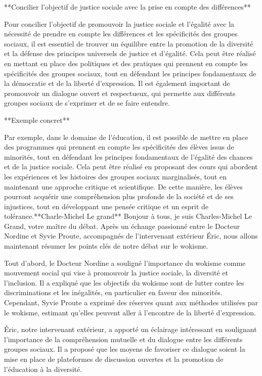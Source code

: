 **Concilier l'objectif de justice sociale avec la prise en compte des différences**

Pour concilier l'objectif de promouvoir la justice sociale et l'égalité avec la nécessité de prendre en compte les différences et les spécificités des groupes sociaux, il est essentiel de trouver un équilibre entre la promotion de la diversité et la défense des principes universels de justice et d'égalité. Cela peut être réalisé en mettant en place des politiques et des pratiques qui prennent en compte les spécificités des groupes sociaux, tout en défendant les principes fondamentaux de la démocratie et de la liberté d'expression. Il est également important de promouvoir un dialogue ouvert et respectueux, qui permette aux différents groupes sociaux de s'exprimer et de se faire entendre.

**Exemple concret**

Par exemple, dans le domaine de l'éducation, il est possible de mettre en place des programmes qui prennent en compte les spécificités des élèves issus de minorités, tout en défendant les principes fondamentaux de l'égalité des chances et de la justice sociale. Cela peut être réalisé en proposant des cours qui abordent les expériences et les histoires des groupes sociaux marginalisés, tout en maintenant une approche critique et scientifique. De cette manière, les élèves pourront acquérir une compréhension plus profonde de la société et de ses injustices, tout en développant une pensée critique et un esprit de tolérance.**Charle-Michel Le grand**
Bonjour à tous, je suis Charles-Michel Le Grand, votre maître du débat. Après un échange passionné entre le Docteur Nordine et Syvie Proute, accompagnés de l'intervenant extérieur Éric, nous allons maintenant résumer les points clés de notre débat sur le wokisme.

Tout d'abord, le Docteur Nordine a souligné l'importance du wokisme comme mouvement social qui vise à promouvoir la justice sociale, la diversité et l'inclusion. Il a expliqué que les objectifs du wokisme sont de lutter contre les discriminations et les inégalités, en particulier en faveur des minorités. Cependant, Syvie Proute a exprimé des réserves quant aux méthodes utilisées par le wokisme, estimant qu'elles peuvent aller à l'encontre de la liberté d'expression.

Éric, notre intervenant extérieur, a apporté un éclairage intéressant en soulignant l'importance de la compréhension mutuelle et du dialogue entre les différents groupes sociaux. Il a proposé que les moyens de favoriser ce dialogue soient la mise en place de plateformes de discussion ouvertes et la promotion de l'éducation à la diversité.


